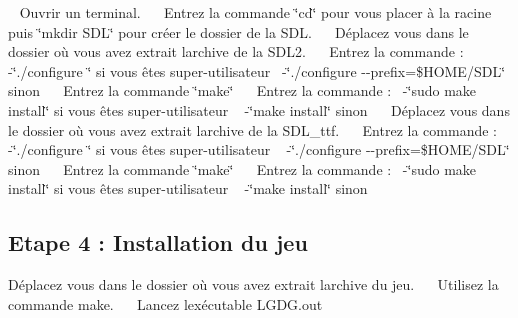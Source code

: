 ~\newline
 Ouvrir un terminal.~\newline
~\newline
 Entrez la commande \char`\"{}cd\char`\"{} pour vous placer à la racine puis \char`\"{}mkdir S\+D\+L\char`\"{} pour créer le dossier de la S\+DL.~\newline
~\newline
 Déplacez vous dans le dossier où vous avez extrait l\textquotesingle{}archive de la S\+D\+L2.~\newline
~\newline
 Entrez la commande \+:~\newline
 -\/\char`\"{}./configure \char`\"{} si vous êtes super-\/utilisateur~\newline
 -\/\char`\"{}./configure -\/-\/prefix=\$\+H\+O\+M\+E/\+S\+D\+L\char`\"{} sinon~\newline
~\newline
 Entrez la commande \char`\"{}make\char`\"{}~\newline
~\newline
 Entrez la commande \+:~\newline
 -\/\char`\"{}sudo make install\char`\"{} si vous êtes super-\/utilisateur ~\newline
 -\/\char`\"{}make install\char`\"{} sinon~\newline
~\newline
 Déplacez vous dans le dossier où vous avez extrait l\textquotesingle{}archive de la S\+D\+L\+\_\+ttf.~\newline
~\newline
 Entrez la commande \+:~\newline
 -\/\char`\"{}./configure \char`\"{} si vous êtes super-\/utilisateur ~\newline
 -\/\char`\"{}./configure -\/-\/prefix=\$\+H\+O\+M\+E/\+S\+D\+L\char`\"{} sinon~\newline
~\newline
 Entrez la commande \char`\"{}make\char`\"{}~\newline
~\newline
 Entrez la commande \+:~\newline
 -\/\char`\"{}sudo make install\char`\"{} si vous êtes super-\/utilisateur ~\newline
 -\/\char`\"{}make install\char`\"{} sinon~\newline
~\newline
\hypertarget{index_step4}{}\subsection{Etape 4 \+: Installation du jeu}\label{index_step4}
Déplacez vous dans le dossier où vous avez extrait l\textquotesingle{}archive du jeu.~\newline
~\newline
 Utilisez la commande make.~\newline
~\newline
 Lancez l\textquotesingle{}exécutable L\+G\+D\+G.\+out~\newline
~\newline
